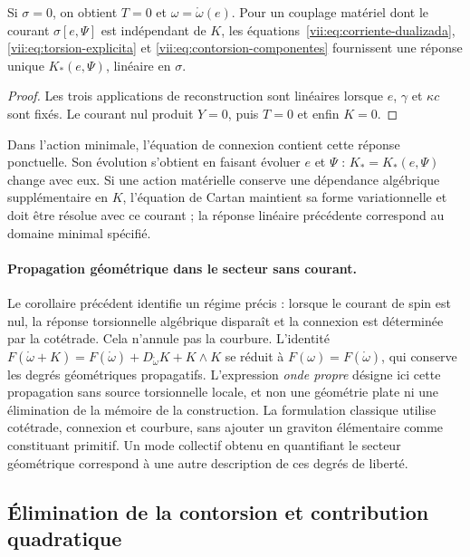 \begin{corollary}
\label{vii:cor:desacoplamiento-torsional}
Si \(\sigma=0\), on obtient \(T=0\) et \(\omega=\mathring\omega(e)\). Pour un couplage matériel dont le courant \(\sigma[e,\Psi]\) est indépendant de \(K\), les équations~\eqref{vii:eq:corriente-dualizada}, \eqref{vii:eq:torsion-explicita} et \eqref{vii:eq:contorsion-componentes} fournissent une réponse unique \(K_*(e,\Psi)\), linéaire en \(\sigma\).
\end{corollary}
\begin{proof}
Les trois applications de reconstruction sont linéaires lorsque \(e\),
\(\gamma\) et \(\kappa c\) sont fixés. Le courant nul produit
\(Y=0\), puis \(T=0\) et enfin \(K=0\).
\end{proof}

Dans l'action minimale, l'équation de connexion contient cette réponse
ponctuelle. Son évolution s'obtient en faisant évoluer \(e\) et \(\Psi\) :
\(K_*=K_*(e,\Psi)\) change avec eux. Si une action matérielle conserve
une dépendance algébrique supplémentaire en \(K\), l'équation de Cartan
maintient sa forme variationnelle et doit être résolue avec ce courant ;
la réponse linéaire précédente correspond au domaine minimal spécifié.


\paragraph{Propagation géométrique dans le secteur sans courant.}
Le corollaire précédent identifie un régime précis : lorsque le courant de spin est nul, la réponse torsionnelle algébrique disparaît et la connexion est déterminée par la cotétrade. Cela n'annule pas la courbure. L'identité \(F(\mathring\omega+K)=F(\mathring\omega)+D_{\mathring\omega}K+K\wedge K\) se réduit à \(F(\omega)=F(\mathring\omega)\), qui conserve les degrés géométriques propagatifs. L'expression \emph{onde propre} désigne ici cette propagation sans source torsionnelle locale, et non une géométrie plate ni une élimination de la mémoire de la construction. La formulation classique utilise cotétrade, connexion et courbure, sans ajouter un graviton élémentaire comme constituant primitif. Un mode collectif obtenu en quantifiant le secteur géométrique correspond à une autre description de ces degrés de liberté.

\subsection{Élimination de la contorsion et contribution quadratique}
\label{vii:subsec:respuesta-cuadratica}

